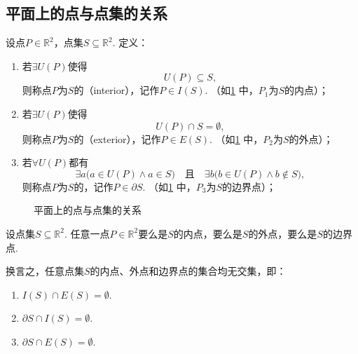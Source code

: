 \subsection{平面上的点与点集的关系}
\begin{definition}
设点\(P\in\mathbb{R}^2\)，点集\(S\subseteq\mathbb{R}^2\).
定义：\begin{enumerate}
\item 若\(\exists U(P)\)使得\[
U(P) \subseteq S,
\]则称点\(P\)为\(S\)的（interior），记作\(P \in I(S)\).
（如\cref{figure:集合论.平面上的点与点集的关系} 中，\(P_1\)为\(S\)的内点）；

\item 若\(\exists U(P)\)使得\[
U(P) \cap S = \emptyset,
\]则称点\(P\)为\(S\)的（exterior），记作\(P \in E(S)\).
（如\cref{figure:集合论.平面上的点与点集的关系} 中，\(P_2\)为\(S\)的外点）；

\item 若\(\forall U(P)\)都有\[
\exists a \bigl( a \in U(P) \land a \in S \bigr)
\quad\text{且}\quad
\exists b \bigl( b \in U(P) \land b \notin S \bigr),
\]则称点\(P\)为\(S\)的，记作\(P \in \partial{S}\).
（如\cref{figure:集合论.平面上的点与点集的关系} 中，\(P_3\)为\(S\)的边界点）；
\end{enumerate}

\begin{figure}[ht]
\centering
{}
\caption{平面上的点与点集的关系}
\label{figure:集合论.平面上的点与点集的关系}
\end{figure}
\end{definition}

\begin{property}
设点集\(S\subseteq\mathbb{R}^2\).
任意一点\(P\in\mathbb{R}^2\)要么是\(S\)的内点，要么是\(S\)的外点，要么是\(S\)的边界点.

换言之，任意点集\(S\)的内点、外点和边界点的集合均无交集，即：
\begin{enumerate}
\item \(I(S) \cap E(S) = \emptyset\).
\item \(\partial{S} \cap I(S) = \emptyset\).
\item \(\partial{S} \cap E(S) = \emptyset\).
\end{enumerate}
\end{property}

